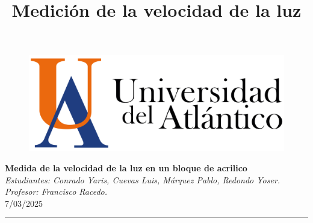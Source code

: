 \documentclass{article}
\title{Medición de la velocidad de la luz}
\begin{document}
	
	\begin{figure}[H]
		\raggedright
		\includegraphics[scale=0.040]{logouni.png}
	\end{figure}

	
	\begin{center}
		{\Large \textbf{Medida de la velocidad de la luz en un bloque de acrilico}}\\
		\vspace{1.3 mm}
	    \large\textit{Estudiantes: Conrado Yaris, Cuevas Luis, Márquez Pablo, Redondo Yoser.\\ Profesor: Francisco Racedo.}\\ 
		7/03/2025
	\end{center}
\begin{center}
		\textcolor{black}{\rule{150mm}{0.5mm}} %
	\end{center}
    \vspace{1.3 mm}
\end{document}
